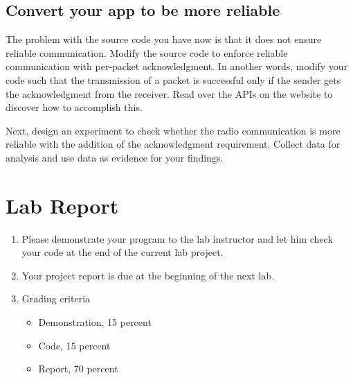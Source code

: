 \documentclass[letterpaper,12pt]{article}
\begin{document}
\subsection*{Convert your app to be more reliable}


    The problem with the source code you have now is that it does not ensure reliable communication.
    Modify the source code to enforce reliable communication with per-packet acknowledgment.
    In another words, modify your code such that the transmission of a packet is successful
    only if the sender gets the acknowledgment from the receiver. Read over the APIs on the website to
    discover how to accomplish this.

    Next, design an experiment to check whether the radio communication is more reliable with
    the addition of the acknowledgment requirement. Collect data for analysis and use data
    as evidence for your findings.
\section*{Lab Report}
\begin{enumerate}
   \item Please demonstrate your program to the lab instructor and let him check your code at the end of the current lab project.
   \item Your project report is due at the beginning of the next lab.
   \item Grading criteria
      \begin{itemize}
         \item Demonstration, 15 percent
         \item Code, 15 percent
         \item Report, 70 percent
      \end{itemize}
\end{enumerate}
\end{document}
